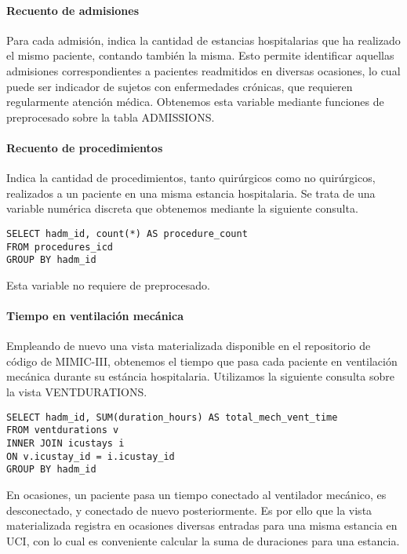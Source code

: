 \documentclass{report}
\begin{document}
\paragraph{Recuento de admisiones}

Para cada admisión, indica la cantidad de estancias hospitalarias que ha
realizado el mismo paciente, contando también la misma. Esto permite identificar aquellas admisiones correspondientes a
pacientes readmitidos en diversas ocasiones, lo cual puede ser indicador
de sujetos con enfermedades crónicas, que requieren regularmente
atención médica. Obtenemos esta variable mediante funciones de preprocesado sobre la
tabla ADMISSIONS.


\paragraph{Recuento de procedimientos}
Indica la cantidad de procedimientos, tanto quirúrgicos como no
quirúrgicos, realizados a un paciente en una misma estancia
hospitalaria. Se trata de una variable numérica discreta que obtenemos
mediante la siguiente consulta.

\begin{verbatim}
SELECT hadm_id, count(*) AS procedure_count
FROM procedures_icd
GROUP BY hadm_id
\end{verbatim}
Esta variable no requiere de preprocesado.

\paragraph{Tiempo en ventilación mecánica}

Empleando de nuevo una vista materializada disponible en el repositorio
de código de MIMIC-III, obtenemos el tiempo que pasa cada paciente en
ventilación mecánica durante su estáncia hospitalaria. Utilizamos la
siguiente consulta sobre la vista VENTDURATIONS.

\begin{verbatim}
SELECT hadm_id, SUM(duration_hours) AS total_mech_vent_time
FROM ventdurations v
INNER JOIN icustays i
ON v.icustay_id = i.icustay_id
GROUP BY hadm_id
\end{verbatim}
En ocasiones, un paciente pasa un tiempo conectado al ventilador
mecánico, es desconectado, y conectado de nuevo posteriormente. Es por
ello que la vista materializada registra en ocasiones diversas entradas
para una misma estancia en UCI, con lo cual es conveniente calcular la
suma de duraciones para una estancia.
\end{document}
